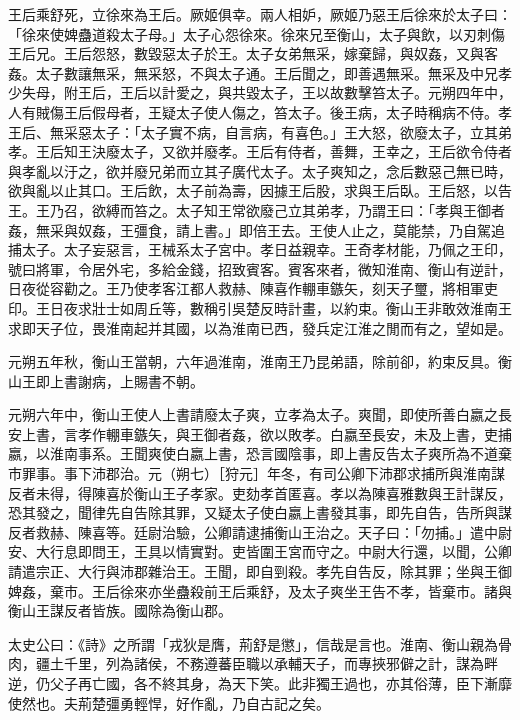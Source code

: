 \begin{pinyinscope}
王后乘舒死，立徐來為王后。厥姬俱幸。兩人相妒，厥姬乃惡王后徐來於太子曰：「徐來使婢蠱道殺太子母。」太子心怨徐來。徐來兄至衡山，太子與飲，以刃刺傷王后兄。王后怨怒，數毀惡太子於王。太子女弟無采，嫁棄歸，與奴姦，又與客姦。太子數讓無采，無采怒，不與太子通。王后聞之，即善遇無采。無采及中兄孝少失母，附王后，王后以計愛之，與共毀太子，王以故數擊笞太子。元朔四年中，人有賊傷王后假母者，王疑太子使人傷之，笞太子。後王病，太子時稱病不侍。孝王后、無采惡太子：「太子實不病，自言病，有喜色。」王大怒，欲廢太子，立其弟孝。王后知王決廢太子，又欲并廢孝。王后有侍者，善舞，王幸之，王后欲令侍者與孝亂以汙之，欲并廢兄弟而立其子廣代太子。太子爽知之，念后數惡己無已時，欲與亂以止其口。王后飲，太子前為壽，因據王后股，求與王后臥。王后怒，以告王。王乃召，欲縛而笞之。太子知王常欲廢己立其弟孝，乃謂王曰：「孝與王御者姦，無采與奴姦，王彊食，請上書。」即倍王去。王使人止之，莫能禁，乃自駕追捕太子。太子妄惡言，王械系太子宮中。孝日益親幸。王奇孝材能，乃佩之王印，號曰將軍，令居外宅，多給金錢，招致賓客。賓客來者，微知淮南、衡山有逆計，日夜從容勸之。王乃使孝客江都人救赫、陳喜作輣車鏃矢，刻天子璽，將相軍吏印。王日夜求壯士如周丘等，數稱引吳楚反時計畫，以約束。衡山王非敢效淮南王求即天子位，畏淮南起并其國，以為淮南已西，發兵定江淮之閒而有之，望如是。

元朔五年秋，衡山王當朝，六年過淮南，淮南王乃昆弟語，除前卻，約束反具。衡山王即上書謝病，上賜書不朝。

元朔六年中，衡山王使人上書請廢太子爽，立孝為太子。爽聞，即使所善白嬴之長安上書，言孝作輣車鏃矢，與王御者姦，欲以敗孝。白嬴至長安，未及上書，吏捕嬴，以淮南事系。王聞爽使白嬴上書，恐言國陰事，即上書反告太子爽所為不道棄市罪事。事下沛郡治。元（朔七）［狩元］年冬，有司公卿下沛郡求捕所與淮南謀反者未得，得陳喜於衡山王子孝家。吏劾孝首匿喜。孝以為陳喜雅數與王計謀反，恐其發之，聞律先自告除其罪，又疑太子使白嬴上書發其事，即先自告，告所與謀反者救赫、陳喜等。廷尉治驗，公卿請逮捕衡山王治之。天子曰：「勿捕。」遣中尉安、大行息即問王，王具以情實對。吏皆圍王宮而守之。中尉大行還，以聞，公卿請遣宗正、大行與沛郡雜治王。王聞，即自剄殺。孝先自告反，除其罪；坐與王御婢姦，棄市。王后徐來亦坐蠱殺前王后乘舒，及太子爽坐王告不孝，皆棄市。諸與衡山王謀反者皆族。國除為衡山郡。

太史公曰：《詩》之所謂「戎狄是膺，荊舒是懲」，信哉是言也。淮南、衡山親為骨肉，疆土千里，列為諸侯，不務遵蕃臣職以承輔天子，而專挾邪僻之計，謀為畔逆，仍父子再亡國，各不終其身，為天下笑。此非獨王過也，亦其俗薄，臣下漸靡使然也。夫荊楚彊勇輕悍，好作亂，乃自古記之矣。


\end{pinyinscope}